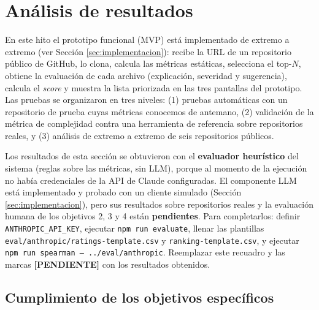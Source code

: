 \section{Análisis de resultados}
\label{sec:resultados}

En este hito el prototipo funcional (MVP) está implementado de extremo a extremo (ver Sección \ref{sec:implementacion}): recibe la URL de un repositorio público de GitHub, lo clona, calcula las métricas estáticas, selecciona el top-$N$, obtiene la evaluación de cada archivo (explicación, severidad y sugerencia), calcula el \textit{score} y muestra la lista priorizada en las tres pantallas del prototipo. Las pruebas se organizaron en tres niveles: (1) pruebas automáticas con un repositorio de prueba cuyas métricas conocemos de antemano, (2) validación de la métrica de complejidad contra una herramienta de referencia sobre repositorios reales, y (3) análisis de extremo a extremo de seis repositorios públicos.

\begin{tcolorbox}[colback=yellow!10!white,colframe=red!75!black,title=Estado de la evaluación (leer antes de entregar)]
Los resultados de esta sección se obtuvieron con el \textbf{evaluador heurístico} del sistema (reglas sobre las métricas, sin LLM), porque al momento de la ejecución no había credenciales de la API de Claude configuradas. El componente LLM está implementado y probado con un cliente simulado (Sección \ref{sec:implementacion}), pero sus resultados sobre repositorios reales y la evaluación humana de los objetivos 2, 3 y 4 están \textbf{pendientes}. Para completarlos: definir \texttt{ANTHROPIC\_API\_KEY}, ejecutar \texttt{npm run evaluate}, llenar las plantillas \texttt{eval/anthropic/ratings-template.csv} y \texttt{ranking-template.csv}, y ejecutar \texttt{npm run spearman -- ../eval/anthropic}. Reemplazar este recuadro y las marcas \textbf{[PENDIENTE]} con los resultados obtenidos.
\end{tcolorbox}

\subsection{Cumplimiento de los objetivos específicos}

